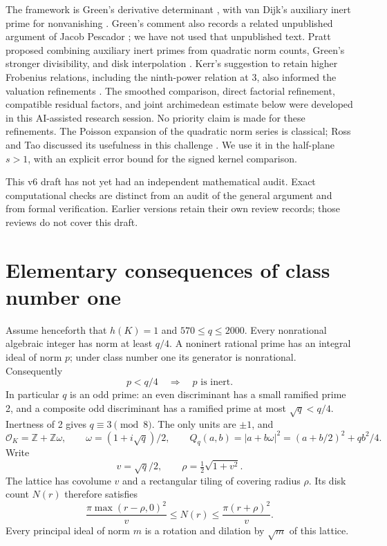 \documentclass[11pt]{article}
\newcommand{\Z}{\mathbb Z}
\newcommand{\OK}{\mathcal O_K}
\begin{document}
The framework is Green's derivative determinant \cite{green}, with
van Dijk's auxiliary inert prime for nonvanishing \cite{vandijk}.
Green's comment also records a related unpublished argument of Jacob
Pescador \cite{greencomment}; we have not used that unpublished text.
Pratt proposed combining auxiliary inert primes from quadratic norm
counts, Green's stronger divisibility, and disk interpolation
\cite{pratt}. Kerr's suggestion to retain higher Frobenius relations,
including the ninth-power relation at 3, also informed the valuation
refinements \cite{kerrcomment}. The smoothed comparison, direct factorial
refinement, compatible residual factors, and joint archimedean estimate
below were developed in this AI-assisted research session. No priority
claim is made for these refinements.
The Poisson expansion of the quadratic norm series is classical;
Ross and Tao discussed its usefulness in this challenge
\cite{ross,taocomment}. We use it in the half-plane \(s>1\), with
an explicit error bound for the signed kernel comparison.

This v6 draft has not yet had an independent mathematical audit. Exact
computational checks are distinct from an audit of the general argument
and from formal verification. Earlier versions retain their own review
records; those reviews do not cover this draft.

\section{Elementary consequences of class number one}
Assume henceforth that \(h(K)=1\) and \(570\le q\le2000\).
Every nonrational algebraic integer has norm at least \(q/4\).
A noninert rational prime has an integral ideal of norm \(p\);
under class number one its generator is nonrational. Consequently
\begin{equation}\label{small-inert}
 p<q/4\quad\Longrightarrow\quad p\text{ is inert}.
\end{equation}
In particular \(q\) is an odd prime: an even discriminant has a small
ramified prime 2, and a composite odd discriminant has a ramified prime
at most \(\sqrt q<q/4\). Inertness of 2 gives \(q\equiv3\pmod8\).
The only units are \(\pm1\), and
\[
 \OK=\Z+\Z\omega,\qquad \omega=(1+i\sqrt q)/2,\qquad
 Q_q(a,b)=|a+b\omega|^2=(a+b/2)^2+qb^2/4.
\]
Write
\[
 v=\sqrt q/2,\qquad \rho=\tfrac12\sqrt{1+v^2}.
\]
The lattice has covolume \(v\) and a rectangular tiling of covering
radius \(\rho\). Its disk count \(N(r)\) therefore satisfies
\begin{equation}\label{disk}
 \frac{\pi\max(r-\rho,0)^2}{v}\le N(r)
 \le\frac{\pi(r+\rho)^2}{v}.
\end{equation}
Every principal ideal of norm \(m\) is a rotation and dilation by
\(\sqrt m\) of this lattice.
\end{document}
